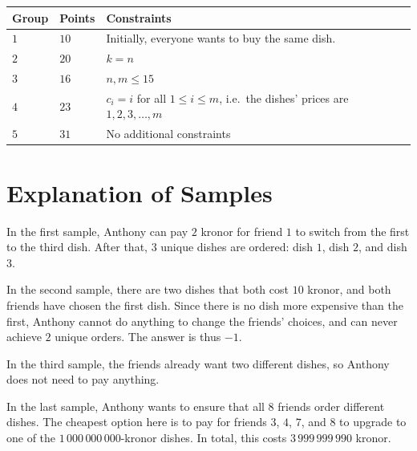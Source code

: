 \noindent
\begin{tabular}{| l | l | l |}
\hline
Group & Points & Constraints \\ \hline
$1$    & $10$         & Initially, everyone wants to buy the same dish. \\ \hline
$2$    & $20$         & $k = n$ \\ \hline
$3$    & $16$         & $n, m \le 15$ \\ \hline
$4$    & $23$         & $c_i = i$ for all $1 \leq i \leq m$, i.e.\ the dishes' prices are $1, 2, 3, \dots, m$ \\ \hline
$5$    & $31$         & No additional constraints \\ \hline
\end{tabular}

\section*{Explanation of Samples}
In the first sample, Anthony can pay $2$ kronor for friend $1$ to switch from the first to the third dish. After that, $3$ unique dishes are ordered: dish $1$, dish $2$, and dish $3$.

In the second sample, there are two dishes that both cost $10$ kronor, and both friends have chosen the first dish. Since there is no dish more expensive than the first, Anthony cannot do anything to change the friends' choices, and can never achieve $2$ unique orders. The answer is thus $-1$.

In the third sample, the friends already want two different dishes, so Anthony does not need to pay anything.

In the last sample, Anthony wants to ensure that all $8$ friends order different dishes. The cheapest option here is to pay for friends $3$, $4$, $7$, and $8$ to upgrade to one of the $1\,000\,000\,000$-kronor dishes. In total, this costs $3\,999\,999\,990$ kronor.
